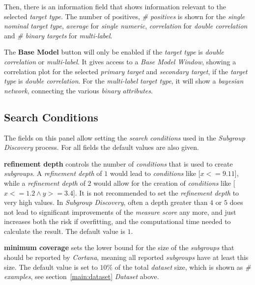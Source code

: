 \documentclass{article}
\begin{document}
Then, there is an information field that shows information relevant to the selected \emph{target type}.
The number of positives, \emph{\# positives} is shown for the \emph{single nominal} \emph{target type}, \emph{average} for \emph{single numeric}, \emph{correlation} for \emph{double correlation} and \emph{\# binary targets} for \emph{multi-label}.

The \textbf{Base Model} button will only be enabled if the \emph{target type} is \emph{double correlation} or \emph{multi-label}.
It gives access to a \emph{Base Model Window}, showing a correlation plot for the selected \emph{primary target} and \emph{secondary target}, if the \emph{target type} is \emph{double correlation}.
For the \emph{multi-label} \emph{target type}, it will show a \emph{bayesian network}, connecting the various \emph{binary} \emph{attributes}.







\subsection{Search Conditions}
\label{main:search-conditions}

The fields on this panel allow setting the \emph{search conditions} used in the \emph{Subgroup Discovery} process.
For all fields the default values are also given.

\textbf{refinement depth} controls the number of \emph{conditions} that is used to create \emph{subgroups}.
A \emph{refinement depth} of $1$ would lead to \emph{conditions} like \mbox{[$x <= 9.11$]}, while a \emph{refinement depth} of $2$ would allow for the creation of \emph{conditions} like \mbox{[$x <= 1.2 \wedge y >= 3.4$]}.
It is not recommended to set the \emph{refinement depth} to very high values.
In \emph{Subgroup Discovery}, often a depth greater than $4$ or $5$ does not lead to significant improvements of the \emph{measure score} any more, and just increases both the risk if overfitting, and the computational time needed to calculate the result.
The default value is $1$.

\textbf{minimum coverage} sets the lower bound for the size of the \emph{subgroups} that should be reported by \emph{Cortana}, meaning all reported \emph{subgroups} have at least this size.
The default value is set to $10\%$ of the total \emph{dataset} size, which is shown as \emph{\# examples}, see section~\ref{main:dataset} \emph{Dataset} above.
\end{document}
